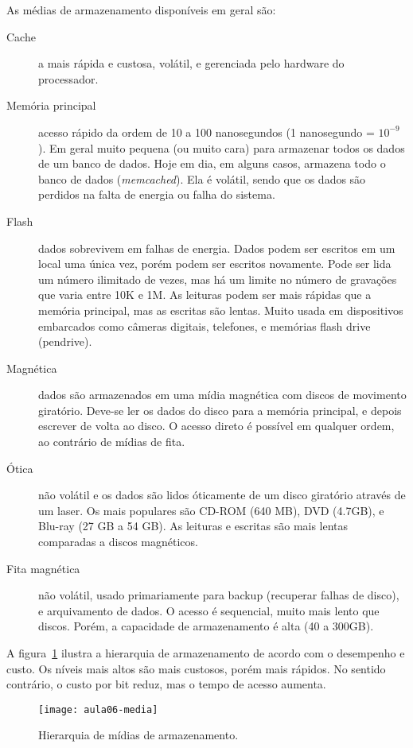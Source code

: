 As médias de armazenamento disponíveis em geral são:
\begin{description}
\item[Cache] a mais rápida e custosa, volátil, e gerenciada pelo hardware
do processador.

\item[Memória principal] acesso rápido da ordem de 10 a 100 nanosegundos (1 nanosegundo = $10^{-9}$).
Em geral muito pequena (ou muito cara) para armazenar todos os dados de um banco de dados.
Hoje  em dia, em alguns casos, armazena todo o banco de dados (\emph{memcached}).
Ela é volátil, sendo que os dados são perdidos na falta de energia ou falha do sistema.

\item[Flash] dados sobrevivem em falhas de energia. Dados podem ser escritos em um local
uma única vez, porém podem ser escritos novamente.
Pode ser lida um número ilimitado de vezes, mas há um limite no  número de gravações
que varia entre 10K e 1M.
As leituras podem ser mais rápidas que a memória principal, mas as escritas
são lentas.
Muito usada em dispositivos embarcados como câmeras digitais, 
telefones, e memórias flash drive (pendrive).

\item[Magnética] dados são armazenados em uma mídia magnética com discos de movimento
giratório. 
Deve-se ler os dados do disco para a memória principal, e depois escrever de volta ao disco.
O acesso direto é possível em qualquer ordem, ao contrário de mídias de fita.


\item[Ótica] não volátil e os dados são lidos óticamente de um disco 
giratório através de um laser.
Os mais populares são CD-ROM (640 MB), DVD (4.7GB), e Blu-ray (27 GB a 54 GB).
As leituras e escritas são mais lentas comparadas a discos magnéticos.

\item[Fita magnética]
não volátil, usado primariamente para backup (recuperar falhas de disco), e 
arquivamento de dados.
O acesso é sequencial, muito mais lento que discos. Porém, a capacidade
de armazenamento é alta (40 a 300GB).
\end{description}

A figura~\ref{aula06:fig:media} ilustra a hierarquia de armazenamento de acordo com 
o desempenho e custo.
Os níveis mais altos são mais custosos, porém mais rápidos.
No sentido contrário, o custo por bit reduz, mas o tempo de acesso aumenta.
%
\begin{figure}[!htb]
\centering
\texttt{[image: aula06-media]}
\caption{Hierarquia de mídias de armazenamento.}
\label{aula06:fig:media}
\end{figure}

